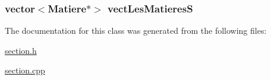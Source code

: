 \hypertarget{classSection_ac816c4198248b1f331bd732964b7ebcf}{
\subsubsection[{vect\+Les\+Matieres\+S}]{\setlength{\rightskip}{0pt plus 5cm}vector$<${\bf Matiere}$\ast$$>$ vect\+Les\+Matieres\+S\hspace{0.3cm}{\ttfamily [private]}}}\label{classSection_ac816c4198248b1f331bd732964b7ebcf}


The documentation for this class was generated from the following files\+:\begin{DoxyCompactItemize}
\item 
\hyperlink{section_8h}{section.\+h}\item 
\hyperlink{section_8cpp}{section.\+cpp}\end{DoxyCompactItemize}
